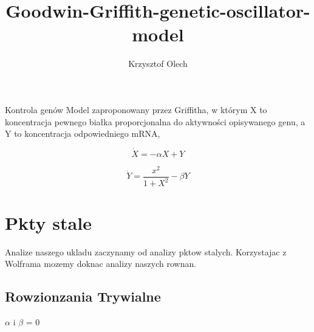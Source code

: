\documentclass{article}
\title{Goodwin-Griffith-genetic-oscillator-model}
\author{Krzysztof Olech}
\begin{document}
    \maketitle


    Kontrola genów Model zaproponowany przez Griffitha, w którym X to koncentracja pewnego białka proporcjonalna do aktywności opisywanego genu, a Y to koncentracja odpowiedniego mRNA,

    $$\dot{X} = -\alpha X+Y$$

    $$\dot{Y} = \frac{x^2}{1+X^2}-\beta Y$$

    \newpage
    \tableofcontents

    \newpage


    \section{Pkty stale}

    Analize naszego ukladu zaczynamy od analizy pktow stalych. Korzystajac z Wolframa mozemy doknac analizy naszych rownan.

    \subsection{Rowzionzania Trywialne}
    $\alpha$ i $\beta$ = 0
\end{document}
